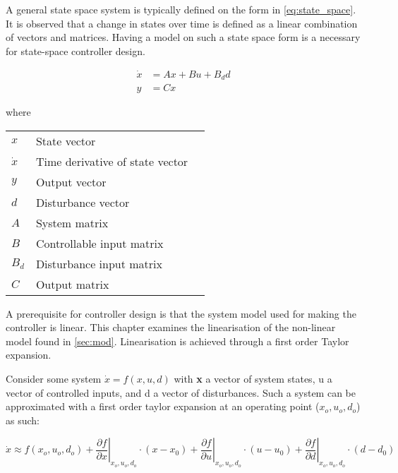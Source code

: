 A general state space system is typically defined on the form in \cref{eq:state_space}. It is observed that a change in states over time is defined as a linear combination of vectors and matrices. Having a model on such a state space form is a necessary for state-space controller design.

\begin{equation} \label{eq:state_space}
	\begin{split}
		\dot{x} & = Ax + Bu + B_dd \\
		y 		& = Cx
	\end{split}
\end{equation}

where

\begin{center}
	\begin{tabular}{l p{8cm} l}
		$x$       & State vector                    &  \\
		$\dot{x}$ & Time derivative of state vector &  \\
		$y$       & Output vector                   &  \\
		$d$       & Disturbance vector              &  \\
		$A$       & System matrix                   &  \\
		$B$       & Controllable input matrix       &  \\
		$B_d$     & Disturbance input matrix        &  \\
		$C$       & Output matrix                   &
	\end{tabular}
\end{center}

A prerequisite for controller design is that the system model used for making the controller is linear. This chapter examines the linearisation of the non-linear model found in \cref{sec:mod}. Linearisation is achieved through a first order Taylor expansion.

Consider some system $\dot{x} = f(x,u,d)$ with \textbf{x} a vector of system states, u a vector of controlled inputs, and d a vector of disturbances. Such a system can be approximated with a first order taylor expansion at an operating point ($x_o, u_o, d_o$) as such:

\begin{equation} \label{eq:taylor}
	\dot{x}   \approx   f(x_o, u_o, d_o)   +
	\left. \dfrac{\partial f}{\partial x} \right |_{x_o, u_o, d_o} \cdot (x-x_0) +
	\left. \dfrac{\partial f}{\partial u} \right |_{x_o, u_o, d_o} \cdot (u-u_0) +
	\left. \dfrac{\partial f}{\partial d} \right |_{x_o, u_o, d_o} \cdot (d-d_0)
\end{equation}

